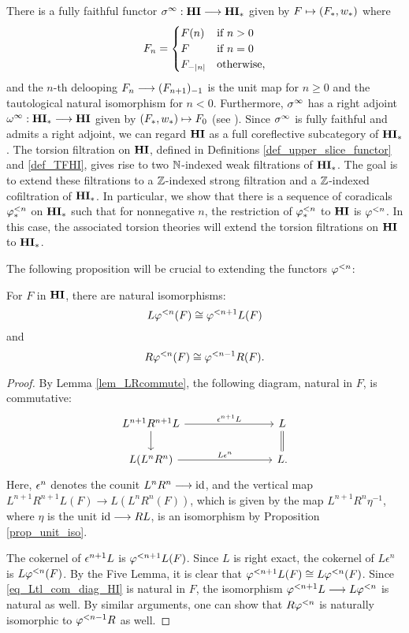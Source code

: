 There is a fully faithful functor $\spectHI: \HI \to \HM$ given
by $F \mapsto (F_*, \deloop_*)$ where
\[
F_n = \begin{cases}
F(n) &\textrm{if }n > 0 \\
F    &\textrm{if }n = 0 \\
\RHI[|n|]F &\textrm{otherwise},
\end{cases}
\]
and the $n$-th delooping $F_n \to \RHI{(F_{n + 1})}$ is the unit map
for $n \geq 0$ and the tautological natural isomorphism for $n < 0$. Furthermore,
$\spectHI$ has a right adjoint $\loopHM: \HM \to \HI$ given by
$(F_*, \deloop_*) \mapsto F_0$ (see \cite[1.18]{DegModHom}).  Since
$\spectHI$ is fully faithful and admits a right adjoint, we can regard
$\HI$ as a full coreflective subcategory of $\HM$. The torsion
filtration on $\HI$, defined in Definitions
\ref{def_upper_slice_functor} and \ref{def_TFHI},
gives rise to two $\N$-indexed weak filtrations of $\HM$. The goal 
is to extend these filtrations to a $\Z$-indexed strong filtration 
and a $\Z$-indexed cofiltration of $\HM$. In particular, we show
that there is a sequence of coradicals $\tlHM{n}$
on $\HM$ such that for nonnegative $n$, the restriction of 
$\tlHM{n}$ to $\HI$ is $\tlHI{n}$. In this case, the associated
torsion theories will extend the torsion 
filtrations on $\HI$ to $\HM$.

The following proposition will be crucial to extending the 
functors $\tlHI{n}$:

\begin{prop}\label{prop_tl_L_R}
For $F$ in $\HI$, there are natural isomorphisms:
\[
L \tlHI{n}(F) \cong \tlHI{n + 1} L(F)
\]
and
\[
R\tlHI{n}(F) \cong \tlHI{n - 1}R(F).
\] 
\end{prop}
\begin{proof}
By Lemma \ref{lem_LRcommute}, the following diagram, natural in $F$, 
is commutative:
\begin{equation}\label{eq_Ltl_com_diag_HI}
\begin{tikzcd}[column sep=80pt]
L^{n + 1}R^{n + 1}L \arrow{r}{\cuHI^{n + 1}L} \arrow{d} &
L \arrow[equals]{d} \\
L(L^{n}R^n) \arrow{r}{L\cuHI^{n}} &
L.
\end{tikzcd}
\end{equation}
Here, $\cuHI^n$ denotes the counit $L^nR^n \to \id$,
and the vertical map $L^{n + 1}R^{n + 1}L(F) \to L(L^nR^n (F))$, which is 
given by the map $L^{n + 1}R^n \eta^{-1}$, where $\eta$ is
the unit $\id \to RL$, is an isomorphism by Proposition 
\ref{prop_unit_iso}.

The cokernel of $\cuHI^{n + 1}L$ is $\tlHI{n + 1}L(F)$. Since $L$ 
is right exact, the cokernel of $L\epsilon^n$ is $L\tlHI{n}(F)$. 
By the Five Lemma, it is clear that $\tlHI{n + 1}L(F) \cong 
L\tlHI{n}(F)$. Since \eqref{eq_Ltl_com_diag_HI} is natural in $F$,
the isomorphism $\tlHI{n + 1}L \to L\tlHI{n}$ is natural as well.
By similar arguments, one can show that $R\tlHI{n}$ is naturally
isomorphic to $\tlHI{n - 1}R$ as well.
\end{proof}


